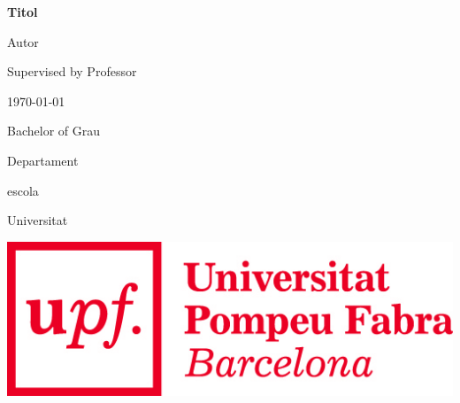 \def\title{Titol}
\def\autor{Autor}
\def\supervisor{Professor}
\def\bachelor{Grau}
\def\department{Departament}
\def\escola{escola}
\def\uni{Universitat}



\begin{titlepage}

\begin{center}

\vspace{1.5cm}

{\LARGE \bfseries \title }

\vspace{1.5cm}

{\Large \autor }

\vspace{.5cm}

{\Large Supervised by \supervisor }

\vspace{3.5cm}

{\large \today}

\vspace{3.5cm}

{\Large Bachelor of \bachelor }

\vspace{0.5cm}

{\Large \department}

\vspace{0.5cm}

{\Large \escola}

\vspace{0.5cm}

{\Large \uni}

\vspace*{\fill}

\includegraphics[scale=0.4]{upf_word_imp.jpg}

\end{center}

\end{titlepage}


